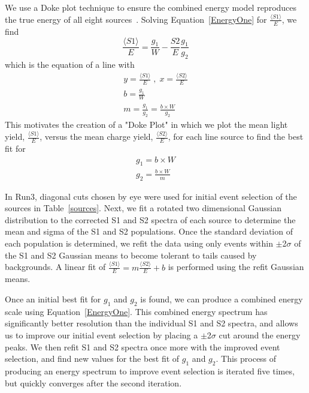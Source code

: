We use a Doke plot technique to ensure the combined energy model reproduces the true energy of all eight sources~\cite{Doke,Dobi}.  Solving Equation~\ref{EnergyOne} for $\frac{\langle S1 \rangle}{E}$, we find
\begin{equation}\label{four}
\frac{\langle S1 \rangle}{E} = \frac{g_1}{W} - \frac{S2}{E}\frac{g_1}{g_2}
\end{equation}
which is the equation of a line with
\begin{subequations}
\begin{align}
y=\frac{\langle S1 \rangle}{E} \; , \; x=\frac{\langle S2 \rangle}{E} \\
b=\frac{g_1}{W} \\
m=\frac{g_1}{g_2}=\frac{b \times W}{g_2}
\end{align}
\end{subequations}
This motivates the creation of a "Doke Plot" in which we plot the mean light yield, $\frac{\langle S1 \rangle}{E}$, versus the mean charge yield, $\frac{\langle S2 \rangle}{E}$, for each line source to find the best fit for
\begin{subequations}\label{six}
\begin{align}
g_1 = b \times W \\
g_2 = \frac{b \times W}{m}
\end{align}
\end{subequations}

In Run3, diagonal cuts chosen by eye were used for initial event selection of the sources in Table~\ref{sources}. Next, we fit a rotated two dimensional Gaussian distribution to the corrected S1 and S2 spectra of each source to determine the mean and sigma of the S1 and S2 populations. Once the standard deviation of each population is determined, we refit the data using only events within $\pm$2$\sigma$ of the S1 and S2 Gaussian means to become tolerant to tails caused by backgrounds.  A linear fit of $\frac{\langle S1 \rangle}{E} = m \frac{\langle S2 \rangle}{E} + b$ is performed using the refit Gaussian means.  

Once an initial best fit for $g_1$ and $g_2$ is found, we can produce a combined energy scale using Equation~\ref{EnergyOne}.  This combined energy spectrum has significantly better resolution than the individual S1 and S2 spectra, and allows us to improve our initial event selection by placing a $\pm$2$\sigma$ cut around the energy peaks.  We then refit S1 and S2 spectra once more with the improved event selection, and find new values for the best fit of $g_1$ and $g_2$.  This process of producing an energy spectrum to improve event selection is iterated five times, but quickly converges after the second iteration.

